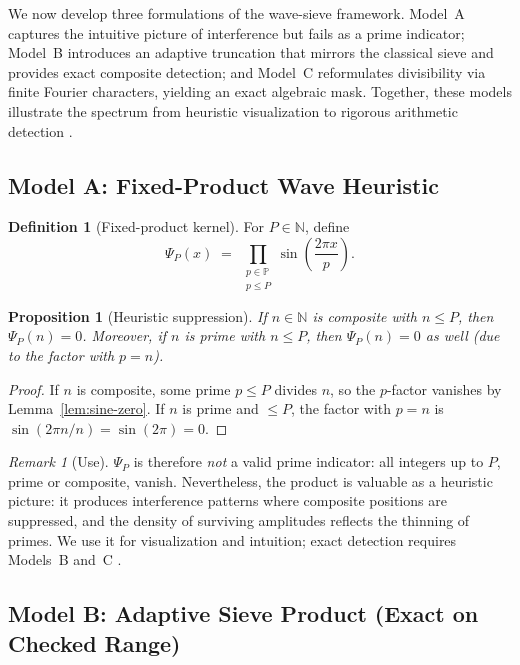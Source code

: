 \documentclass[12pt]{article}
\newtheorem{proposition}{Proposition}
\theoremstyle{definition}
\newtheorem{definition}{Definition}
\theoremstyle{remark}
\newtheorem{remark}{Remark}
\newcommand{\N}{\mathbb{N}}
\newcommand{\Primes}{\mathbb{P}}
\begin{document}
We now develop three formulations of the wave-sieve framework. 
Model~A captures the intuitive picture of interference but fails as a prime indicator; 
Model~B introduces an adaptive truncation that mirrors the classical sieve and provides exact composite detection; 
and Model~C reformulates divisibility via finite Fourier characters, yielding an exact algebraic mask. 
Together, these models illustrate the spectrum from heuristic visualization to rigorous arithmetic detection 
\citep{hardy2008introduction,tenenbaum2015analytic}.

\subsection{Model A: Fixed-Product Wave Heuristic}

\begin{definition}[Fixed-product kernel]
For \(P\in\N\), define
\[
  \Psi_P(x)\;=\; \prod_{\substack{p\in\Primes\\ p\le P}} \sin\!\left(\frac{2\pi x}{p}\right).
\]
\end{definition}

\begin{proposition}[Heuristic suppression]\label{prop:heuristic}
If \(n\in\N\) is composite with \(n\le P\), then \(\Psi_P(n)=0\). 
Moreover, if \(n\) is prime with \(n\le P\), then \(\Psi_P(n)=0\) as well (due to the factor with \(p=n\)).
\end{proposition}
\begin{proof}
If \(n\) is composite, some prime \(p\le P\) divides \(n\), so the \(p\)-factor vanishes by Lemma~\ref{lem:sine-zero}. 
If \(n\) is prime and \(\le P\), the factor with \(p=n\) is \(\sin(2\pi n/n)=\sin(2\pi)=0\).
\end{proof}

\begin{remark}[Use]
\(\Psi_P\) is therefore \emph{not} a valid prime indicator: all integers up to \(P\), prime or composite, vanish. 
Nevertheless, the product is valuable as a heuristic picture: it produces interference patterns where composite 
positions are suppressed, and the density of surviving amplitudes reflects the thinning of primes. 
We use it for visualization and intuition; exact detection requires Models~B and~C 
\citep{ribenboim1991book}.
\end{remark}

\subsection{Model B: Adaptive Sieve Product (Exact on Checked Range)}
\end{document}
